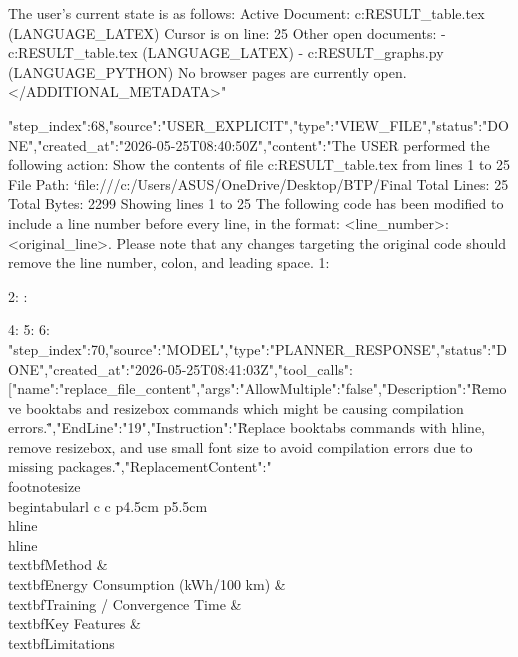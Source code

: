 \begin{table}[t]
{The user's current state is as follows:
Active Document: c:\Users\ASUS\OneDrive\Desktop\BTP\Final RESULT\comparison_table.tex (LANGUAGE_LATEX)
Cursor is on line: 25
Other open documents:
- c:\Users\ASUS\OneDrive\Desktop\BTP\Final RESULT\comparison_table.tex (LANGUAGE_LATEX)
- c:\Users\ASUS\OneDrive\Desktop\BTP\Final RESULT\generate_graphs.py (LANGUAGE_PYTHON)
No browser pages are currently open.
</ADDITIONAL_METADATA>"}
{"step_index":68,"source":"USER_EXPLICIT","type":"VIEW_FILE","status":"DONE","created_at":"2026-05-25T08:40:50Z","content":"The USER performed the following action:
Show the contents of file c:\Users\ASUS\OneDrive\Desktop\BTP\Final RESULT\comparison_table.tex from lines 1 to 25
File Path: `file:///c:/Users/ASUS/OneDrive/Desktop/BTP/Final%
Total Lines: 25
Total Bytes: 2299
Showing lines 1 to 25
The following code has been modified to include a line number before every line, in the format: <line_number>: <original_line>. Please note that any changes targeting the original code should remove the line number, colon, and leading space.
1: \begin{table}[t]
2: : \caption{Comparison of Different EV Routing Methods on 50-Node SG-GAN Generated Topology}
4: \label{tab:algorithm_comparison}
5: \renewcommand{\arraystretch}{1.3} %
6: 
{"step_index":70,"source":"MODEL","type":"PLANNER_RESPONSE","status":"DONE","created_at":"2026-05-25T08:41:03Z","tool_calls":[{"name":"replace_file_content","args":{"AllowMultiple":"false","Description":"\"Remove booktabs and resizebox commands which might be causing compilation errors.\"","EndLine":"19","Instruction":"\"Replace booktabs commands with hline, remove resizebox, and use small font size to avoid compilation errors due to missing packages.\"","ReplacementContent":"\"\\footnotesize\
\\begin{tabular}{l c c p{4.5cm} p{5.5cm}}\
\\hline \\hline\
\\textbf{Method} & \\textbf{Energy Consumption (kWh/100 km)} & \\textbf{Training / Convergence Time} & \\textbf{Key Features} & \\textbf{Limitations} \\\\\
}}}
\end{table}}
\end{table}
